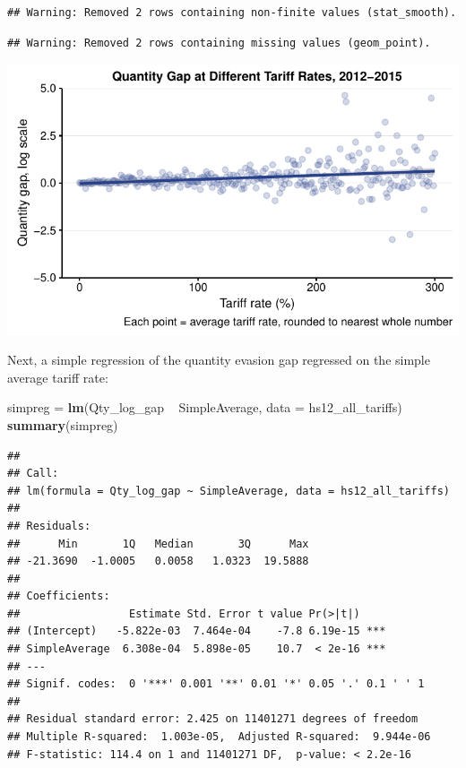 \documentclass[10pt,]{article}
\newenvironment{Shaded}{\begin{snugshade}}{\end{snugshade}}
\newcommand{\KeywordTok}[1]{\textcolor[rgb]{0.13,0.29,0.53}{\textbf{{#1}}}}
\newcommand{\DataTypeTok}[1]{\textcolor[rgb]{0.13,0.29,0.53}{{#1}}}
\newcommand{\StringTok}[1]{\textcolor[rgb]{0.31,0.60,0.02}{{#1}}}
\newcommand{\NormalTok}[1]{{#1}}
\begin{document}
\begin{verbatim}
## Warning: Removed 2 rows containing non-finite values (stat_smooth).
\end{verbatim}

\begin{verbatim}
## Warning: Removed 2 rows containing missing values (geom_point).
\end{verbatim}

\begin{center}\includegraphics{Figs/tariffVtrade_fig2-1} \end{center}

Next, a simple regression of the quantity evasion gap regressed on the
simple average tariff rate:

\begin{Shaded}
\begin{Highlighting}[]
\NormalTok{simpreg =}\StringTok{ }\KeywordTok{lm}\NormalTok{(Qty_log_gap ~}\StringTok{ }\NormalTok{SimpleAverage, }\DataTypeTok{data =} \NormalTok{hs12_all_tariffs)}
\KeywordTok{summary}\NormalTok{(simpreg)}
\end{Highlighting}
\end{Shaded}

\begin{verbatim}
## 
## Call:
## lm(formula = Qty_log_gap ~ SimpleAverage, data = hs12_all_tariffs)
## 
## Residuals:
##      Min       1Q   Median       3Q      Max 
## -21.3690  -1.0005   0.0058   1.0323  19.5888 
## 
## Coefficients:
##                 Estimate Std. Error t value Pr(>|t|)    
## (Intercept)   -5.822e-03  7.464e-04    -7.8 6.19e-15 ***
## SimpleAverage  6.308e-04  5.898e-05    10.7  < 2e-16 ***
## ---
## Signif. codes:  0 '***' 0.001 '**' 0.01 '*' 0.05 '.' 0.1 ' ' 1
## 
## Residual standard error: 2.425 on 11401271 degrees of freedom
## Multiple R-squared:  1.003e-05,  Adjusted R-squared:  9.944e-06 
## F-statistic: 114.4 on 1 and 11401271 DF,  p-value: < 2.2e-16
\end{verbatim}
\end{document}
